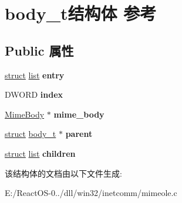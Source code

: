 \hypertarget{structbody__t}{}\section{body\+\_\+t结构体 参考}
\label{structbody__t}
\subsection*{Public 属性}
\begin{DoxyCompactItemize}
\item 
\mbox{\label{structbody__t_a7a39871aa1a2ed74ef96faffa6d3c23f}} 
\hyperlink{interfacestruct}{struct} \hyperlink{classlist}{list} {\bfseries entry}
\item 
\mbox{\label{structbody__t_a4cabe7a5fd0aa0d9cd4907ea7458f5e0}} 
D\+W\+O\+RD {\bfseries index}
\item 
\mbox{\label{structbody__t_ab8502f176fb06d2a5d8e38f2c9fa66cb}} 
\hyperlink{struct_mime_body}{Mime\+Body} $\ast$ {\bfseries mime\+\_\+body}
\item 
\mbox{\label{structbody__t_a1118eb9f4e095a1315f33fd4b474dfb0}} 
\hyperlink{interfacestruct}{struct} \hyperlink{structbody__t}{body\+\_\+t} $\ast$ {\bfseries parent}
\item 
\mbox{\label{structbody__t_a0ff9528b06149f6e57cde4c02676023c}} 
\hyperlink{interfacestruct}{struct} \hyperlink{classlist}{list} {\bfseries children}
\end{DoxyCompactItemize}


该结构体的文档由以下文件生成\+:\begin{DoxyCompactItemize}
\item 
E\+:/\+React\+O\+S-\/0../dll/win32/inetcomm/mimeole.\+c\end{DoxyCompactItemize}
